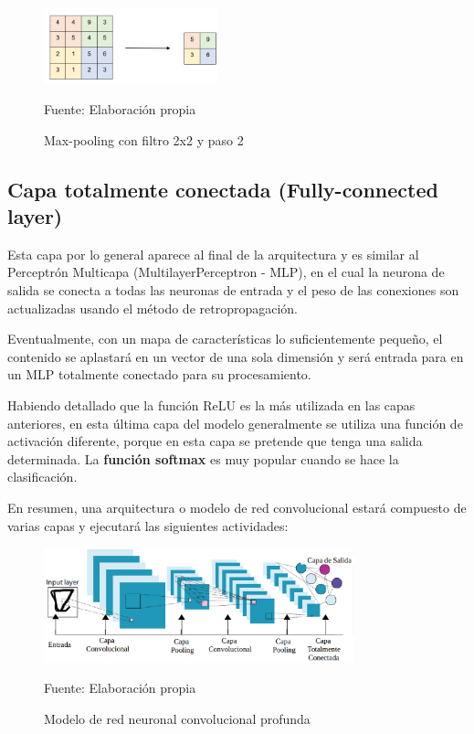 		\begin{figure}[H]
		\begin{center}
		\includegraphics[width=0.45\textwidth]{images/marcoteorico/pool4}
		\end{center}
		\begin{center}
		\caption{\small{Max-pooling con filtro 2x2 y paso 2}}
		{\small{Fuente: Elaboración propia}}
		\end{center}
		\vspace{-1.5em}
		\end{figure}

	\subsection{Capa totalmente conectada (Fully-connected layer)}

		Esta capa por lo general aparece al final de la arquitectura y es similar al Perceptrón Multicapa (MultilayerPerceptron - MLP), en el cual la neurona de salida se conecta a todas las neuronas de entrada y el peso de las conexiones son actualizadas usando el método de retropropagación.
		
		Eventualmente, con un mapa de características lo suficientemente pequeño, el contenido se aplastará en un vector de una sola dimensión y será entrada para en un MLP totalmente conectado para su procesamiento.
		
		Habiendo detallado que la función ReLU es la más utilizada en las capas anteriores, en esta última capa del modelo generalmente se utiliza una función de activación diferente, porque en esta capa se pretende que tenga una salida determinada. La {\bf función softmax} es muy popular cuando se hace la clasificación.
	


En resumen, una arquitectura o modelo de red convolucional estará compuesto de varias capas y ejecutará las siguientes actividades:
\begin{figure}[H]
	\begin{center}
	\includegraphics[width=0.8\textwidth]{images/marcoteorico/modelo}
	\end{center}
	\begin{center}
	\caption{\small{Modelo de red neuronal convolucional profunda}}
	{\small{Fuente: Elaboración propia}}
	\end{center}
	\vspace{-1.5em}
	\end{figure}

